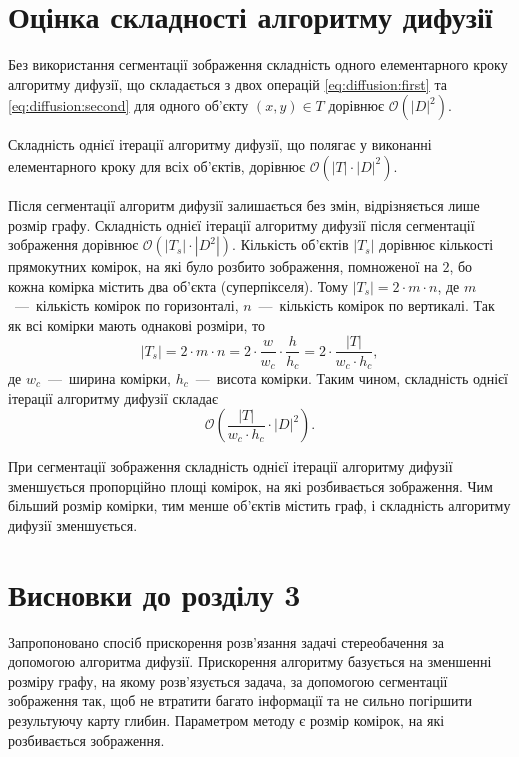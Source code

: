 \section{Оцінка складності алгоритму дифузії}

Без використання сегментації зображення складність
одного елементарного кроку алгоритму дифузії,
що складається з двох операцій \eqref{eq:diffusion:first} та
\eqref{eq:diffusion:second} для одного об'єкту $\left(x, y \right) \in T$
дорівнює $\mathcal{O} \left( \left| D \right|^2 \right)$.

Складність однієї ітерації алгоритму дифузії,
що полягає у виконанні елементарного кроку для всіх об'єктів,
дорівнює $\mathcal{O} \left(\left|T \right| \cdot \left|D\right|^2 \right)$.

Після сегментації алгоритм дифузії залишається без змін,
відрізняється лише розмір графу.
Складність однієї ітерації алгоритму дифузії
після сегментації зображення дорівнює
$\mathcal{O} \left( \left| T_s \right| \cdot \left| D^2 \right| \right)$.
Кількість об'єктів $\left| T_s \right|$ дорівнює кількості прямокутних комірок,
на які було розбито зображення, помноженої на $2$,
бо кожна комірка містить два об'єкта (суперпікселя).
Тому $\left| T_s \right| = 2 \cdot m \cdot n$,
де $m$~---~кількість комірок по горизонталі,
$n$~---~кількість комірок по вертикалі.
Так як всі комірки мають однакові розміри, то
\begin{equation*}
    \left| T_s \right| =
    2 \cdot m \cdot n =
    2 \cdot \frac{w}{w_c} \cdot \frac{h}{h_c} =
    2 \cdot \frac{\left| T \right|}{w_c \cdot h_c},
\end{equation*}
де $w_c$~---~ширина комірки, $h_c$~---~висота комірки.
Таким чином, складність однієї ітерації алгоритму дифузії складає
\begin{equation} \label{eq:diffusion:superpixel:complexity}
    \mathcal{O} \left(
        \frac{\left| T \right|}{w_c \cdot h_c} \cdot \left| D \right|^2
    \right).
\end{equation}

При сегментації зображення складність однієї ітерації алгоритму дифузії
зменшується пропорційно площі комірок, на які розбивається зображення.
Чим більший розмір комірки, тим менше об'єктів містить граф,
і складність алгоритму дифузії зменшується.

\section*{Висновки до розділу 3}

Запропоновано спосіб прискорення розв'язання задачі стереобачення
за допомогою алгоритма дифузії.
Прискорення алгоритму базується на зменшенні розміру графу,
на якому розв'язується задача, за допомогою сегментації зображення так,
щоб не втратити багато інформації та
не сильно погіршити результуючу карту глибин.
Параметром методу є розмір комірок, на які розбивається зображення.
